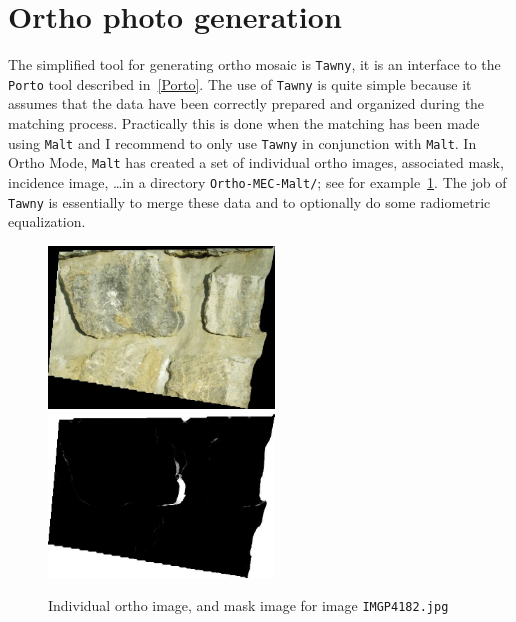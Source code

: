 
\section{Ortho photo generation}

The simplified tool for generating ortho mosaic is {\tt Tawny}, it is
an interface to the {\tt Porto} tool described in~\ref{Porto}.
The use of {\tt Tawny} is quite simple because it assumes that
the data have been correctly prepared and organized during the matching
process. Practically this is done when the matching has been made using
{\tt Malt} and I recommend to only use {\tt Tawny}  in conjunction with
{\tt Malt}. In Ortho Mode, {\tt Malt} has created a set of
individual ortho images, associated mask, incidence image, \dots in
a directory {\tt Ortho-MEC-Malt/}; see for example~\ref{FIG:Malt:Input}.
 The job of {\tt Tawny} is essentially to merge these data and to optionally do some
radiometric equalization.



\begin{figure}
\begin{center}
\includegraphics[width=60mm]{FIGS/MurSaintMartin/Ort_IMGP4182.jpg}
\includegraphics[width=60mm]{FIGS/MurSaintMartin/PC_IMGP4182.jpg}
\end{center}
\caption{Individual ortho image, and mask image for image {\tt IMGP4182.jpg}}
\label{FIG:Malt:Input}
\end{figure}




